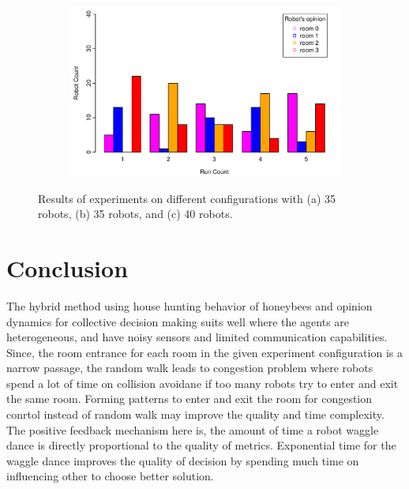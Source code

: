 \documentclass{llncs}
\begin{document}
\begin{figure}[h!]
\begin{subfigure}[b]{0.67\textwidth}
                \includegraphics[width=\textwidth]{PLOT/EXP/exp9}
                \label{fig:exp1}
        \end{subfigure}
        
	\caption{Results of experiments on different configurations with (a) 35 robots, (b) 35 robots, and (c) 40 robots.}\label{fig:plots789}
	\end{figure}
	
	
	\section{Conclusion}\label{sec:conclusion}
	The hybrid method using house hunting behavior of honeybees and opinion dynamics for collective decision making suits well where the agents are heterogeneous, and have noisy sensors and limited communication capabilities. Since, the room entrance for each room in the given experiment configuration is a narrow passage, the random walk leads to congestion problem where robots spend a lot of time on collision avoidane if too many robots try to enter and exit the same room. Forming patterns to enter and exit the room for congestion conrtol instead of random walk may improve the quality and time complexity. The positive feedback mechanism here is, the amount of time a robot waggle dance is directly proportional to the quality of metrics. Exponential time for the waggle dance improves the quality of decision by spending much time on influencing other to choose better solution.
	
	
	
	
	\nocite{*}
	
\end{document}
